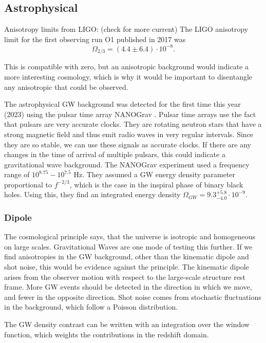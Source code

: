 \subsection{Astrophysical}


Anisotropy limits from LIGO:
(check for more current)
The LIGO anisotropy limit for the first observing run O1 published in 2017
was 
\begin{equation}
    \Omega_{2/3} = (4.4 \pm 6.4) \cdot 10^{-8} .
\end{equation}

This is compatible with zero, but an anisotropic background would indicate
a more interesting cosmology, which is why it would be important to disentangle
any anisotropic that could be observed.

The astrophysical GW background was detected for the first time this year (2023) using the pulsar time array NANOGrav \cite{agazie_nanograv_2023}. Pulsar time arrays use the fact that pulsars are very accurate clocks. They are rotating neutron stars that have a strong magnetic field and thus emit radio waves in very regular intervals. Since they are so stable, we can use these signals as accurate clocks. If there are any changes in the time of arrival of multiple pulsars, this could indicate a gravitational wave background. 
The NANOGrav experiment used a frequency range of $10^{8.75} - 10^{7.5}$ Hz. They assumed a GW energy density parameter proportional to $f^{-2/3}$, which is the case in the inspiral phase of binary black holes. \cite{phinney_practical_2001}
Using this, they find an integrated energy density $\Omega_{GW} = 9.3^{+5.8}_{-4.0}\cdot 10^{-9}$.

\subsubsection{Dipole}
The cosmological principle says, that the universe is isotropic and homogeneous on large scales. Gravitational Waves are one mode of testing this further. If we find anisotropies in the GW background, other than the kinematic dipole and shot noise, this would be evidence against the principle.
The kinematic dipole arises from the observer motion with respect to the large-scale structure rest frame. More GW events should be detected in the direction in which we move, and fewer in the opposite direction. Shot noise comes from stochastic fluctuations in the background, which follow a Poisson distribution.

The GW density contrast can be written with an integration over the window function, which weights the contributions in the redshift domain.

